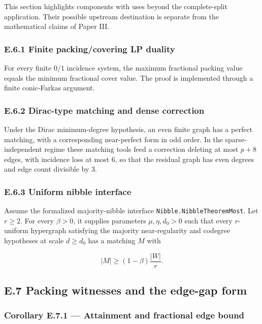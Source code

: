 \documentclass[english,11pt,a4paper]{article}
\begin{document}
This section highlights components with uses beyond the complete-split
application. Their possible upstream destination is separate from the
mathematical claims of Paper III.

\subsubsection{E.6.1 Finite packing/covering LP
duality}\label{e.6.1-finite-packingcovering-lp-duality}

For every finite \(0/1\) incidence system, the maximum fractional
packing value equals the minimum fractional cover value. The proof is
implemented through a finite conic-Farkas argument.

\subsubsection{E.6.2 Dirac-type matching and dense
correction}\label{e.6.2-dirac-type-matching-and-dense-correction}

Under the Dirac minimum-degree hypothesis, an even finite graph has a
perfect matching, with a corresponding near-perfect form in odd order.
In the sparse-independent regime these matching tools feed a correction
deleting at most \(p+8\) edges, with incidence loss at most \(6\), so
that the residual graph has even degrees and edge count divisible by
\(3\).

\subsubsection{E.6.3 Uniform nibble
interface}\label{e.6.3-uniform-nibble-interface}

Assume the formalized majority-nibble interface
\nolinkurl{Nibble.NibbleTheoremMost}. Let \(r\ge2\). For every \(\beta>0\),
it supplies parameters \(\mu,\eta,d_0>0\) such that every \(r\)-uniform
hypergraph satisfying the majority near-regularity and codegree
hypotheses at scale \(d\ge d_0\) has a matching \(M\) with

\[
|M|\ge(1-\beta)\frac{|W|}{r}.
\]

\subsection{E.7 Packing witnesses and the edge-gap
form}\label{e.7-packing-witnesses-and-the-edge-gap-form}

\subsubsection{Corollary E.7.1 --- Attainment and fractional edge
bound}\label{corollary-e.7.1-attainment-and-fractional-edge-bound}
\end{document}
